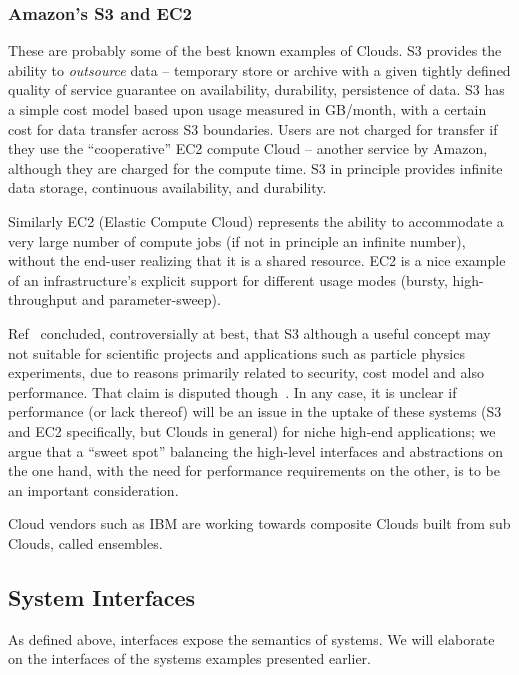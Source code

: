 \documentclass[conference,final]{IEEEtran}
\newcommand{\I}[1]{\textit{#1}}
\begin{document}
  \subsubsection*{Amazon's S3 and EC2}

   These are probably some of the best known examples of Clouds.  S3
   provides the ability to \I{outsource} data -- temporary store or
   archive with a given tightly defined quality of service guarantee
   on availability, durability, persistence of data. S3 has a simple
   cost model based upon usage measured in GB/month, with a certain
   cost for data transfer across S3 boundaries. Users are not charged
   for transfer if they use the ``cooperative'' EC2 compute Cloud --
   another service by Amazon, although they are charged for the
   compute time.  S3 in principle provides infinite data storage,
   continuous availability, and durability.

   Similarly EC2 (Elastic Compute Cloud\cite{amazon-ec2}) represents
   the ability to accommodate a very large number of compute jobs (if
   not in principle an infinite number), without the end-user realizing
   that it is a shared resource. EC2 is a nice example of an
   infrastructure's explicit support for different usage modes
   (bursty, high-throughput and parameter-sweep).

   Ref~\cite{andaS3} concluded, controversially at best, that S3
   although a useful concept may not suitable for scientific projects
   and applications such as particle physics experiments, due to
   reasons primarily related to security, cost model and also
   performance.  That claim is disputed though~\cite{kate_1}.  In any
   case, it is unclear if performance (or lack thereof) will be an
   issue in the uptake of these systems (S3 and EC2 specifically, but
   Clouds in general) for niche high-end applications; we argue that a
   ``sweet spot'' balancing the high-level interfaces and abstractions
   on the one hand, with the need for performance requirements on the
   other, is to be an important consideration.

   Cloud vendors such as IBM are working towards composite Clouds
   built from sub Clouds, called ensembles\cite{irving-ogf22}.


 \subsection{System Interfaces}

  As defined above, interfaces expose the semantics of systems.  We
  will elaborate on the interfaces of the systems examples presented
  earlier.
\end{document}
